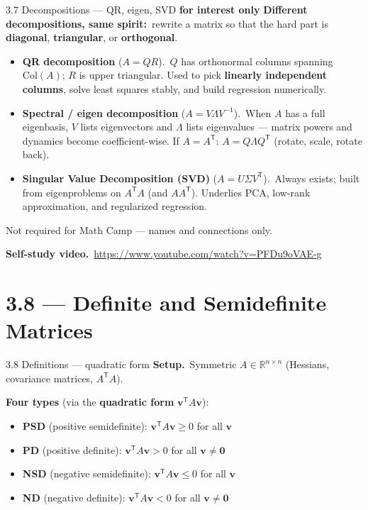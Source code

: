 \documentclass[11pt,aspectratio=169]{beamer}
\newcommand{\InterestOnly}{\textcolor{mAccent}{\textbf{for interest only}}}
\begin{document}
\begin{frame}{3.7 Decompositions --- QR, eigen, SVD \InterestOnly}
  \footnotesize
  \textbf{Different decompositions, same spirit:}\
  rewrite a matrix so that the hard part is \textbf{diagonal}, \textbf{triangular}, or \textbf{orthogonal}.

  \medskip
  \begin{itemize}
    \item \textbf{QR decomposition} ($A=QR$).\
      $Q$ has orthonormal columns spanning $\mathrm{Col}(A)$;
      $R$ is upper triangular.
      Used to pick \textbf{linearly independent columns}, solve least squares stably, and build regression numerically.
    \item \textbf{Spectral / eigen decomposition} ($A=V\Lambda V^{-1}$).\
      When $A$ has a full eigenbasis, $V$ lists eigenvectors and $\Lambda$ lists eigenvalues ---
      matrix powers and dynamics become coefficient-wise.
      If $A=A^{\mathsf T}$: $A=Q\Lambda Q^{\mathsf T}$ (rotate, scale, rotate back).
    \item \textbf{Singular Value Decomposition (SVD)} ($A=U\Sigma V^{\mathsf T}$).\
      Always exists;
      built from eigenproblems on $A^{\mathsf T}A$ (and $AA^{\mathsf T}$).
      Underlies PCA, low-rank approximation, and regularized regression.
  \end{itemize}

  \medskip
  {\scriptsize Not required for Math Camp --- names and connections only.}

  \medskip
  \textbf{Self-study video.}\
  \href{https://www.youtube.com/watch?v=PFDu9oVAE-g}{\textcolor{mAccent}{https://www.youtube.com/watch?v=PFDu9oVAE-g}}
\end{frame}

\section{3.8 --- Definite and Semidefinite Matrices}

\begin{frame}{3.8 Definitions --- quadratic form}
  \hypertarget{sec:matrix-definiteness}{}
  \footnotesize
  \textbf{Setup.}\
  Symmetric $A\in\mathbb{R}^{n\times n}$ (Hessians, covariance matrices, $A^{\mathsf T}A$).

  \medskip
  \textbf{Four types} (via the \textbf{quadratic form} $\mathbf{v}^{\mathsf T}A\mathbf{v}$):
  \begin{itemize}
    \item \textbf{PSD} (positive semidefinite): $\mathbf{v}^{\mathsf T}A\mathbf{v}\ge 0$ for all $\mathbf{v}$
    \item \textbf{PD} (positive definite): $\mathbf{v}^{\mathsf T}A\mathbf{v}> 0$ for all $\mathbf{v}\neq\mathbf{0}$
    \item \textbf{NSD} (negative semidefinite): $\mathbf{v}^{\mathsf T}A\mathbf{v}\le 0$ for all $\mathbf{v}$
    \item \textbf{ND} (negative definite): $\mathbf{v}^{\mathsf T}A\mathbf{v}< 0$ for all $\mathbf{v}\neq\mathbf{0}$
  \end{itemize}
\end{frame}
\end{document}
